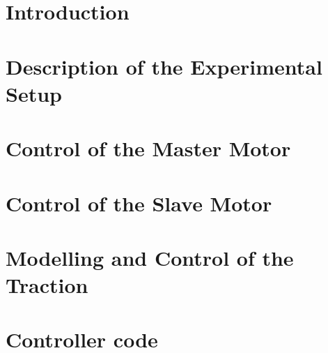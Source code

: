 



\setcounter{page}{2}
\tableofcontents

\hypersetup{allcolors = link}
\chapter{Introduction}


\chapter{Description of the Experimental Setup}
\label{chap:setup}


\chapter{Control of the Master Motor}
\label{chap:masterMotor}


\chapter{Control of the Slave Motor}
\label{chap:slaveMotor}


\chapter{Modelling and Control of the Traction}
\label{chap:traction}


\appendix
\chapter{Controller code}



